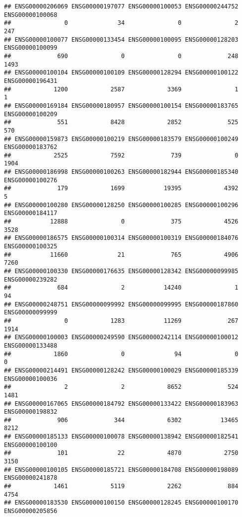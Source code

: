 \documentclass[
]{article}
\begin{document}
\begin{verbatim}
## ENSG00000206069 ENSG00000197077 ENSG00000100053 ENSG00000244752 ENSG00000100068 
##               0              34               0               2             247 
## ENSG00000100077 ENSG00000133454 ENSG00000100095 ENSG00000128203 ENSG00000100099 
##             690               0               0             248            1493 
## ENSG00000100104 ENSG00000100109 ENSG00000128294 ENSG00000100122 ENSG00000196431 
##            1200            2587            3369               1               1 
## ENSG00000169184 ENSG00000180957 ENSG00000100154 ENSG00000183765 ENSG00000100209 
##             551            8428            2852             525             570 
## ENSG00000159873 ENSG00000100219 ENSG00000183579 ENSG00000100249 ENSG00000183762 
##            2525            7592             739               0            1904 
## ENSG00000186998 ENSG00000100263 ENSG00000182944 ENSG00000185340 ENSG00000100276 
##             179            1699           19395            4392               5 
## ENSG00000100280 ENSG00000128250 ENSG00000100285 ENSG00000100296 ENSG00000184117 
##           12888               0             375            4526            3528 
## ENSG00000186575 ENSG00000100314 ENSG00000100319 ENSG00000184076 ENSG00000100325 
##           11660              21             765            4906            7260 
## ENSG00000100330 ENSG00000176635 ENSG00000128342 ENSG00000099985 ENSG00000239282 
##             684               2           14240               1              94 
## ENSG00000248751 ENSG00000099992 ENSG00000099995 ENSG00000187860 ENSG00000099999 
##               0            1283           11269             267            1914 
## ENSG00000100003 ENSG00000249590 ENSG00000242114 ENSG00000100012 ENSG00000133488 
##            1860               0              94               0               0 
## ENSG00000214491 ENSG00000128242 ENSG00000100029 ENSG00000185339 ENSG00000100036 
##               2               2            8652             524            1481 
## ENSG00000167065 ENSG00000184792 ENSG00000133422 ENSG00000183963 ENSG00000198832 
##             906             344            6302           13465            8212 
## ENSG00000185133 ENSG00000100078 ENSG00000138942 ENSG00000182541 ENSG00000100100 
##             101              22            4870            2750            3150 
## ENSG00000100105 ENSG00000185721 ENSG00000184708 ENSG00000198089 ENSG00000241878 
##            1461            5119            2262             884            4754 
## ENSG00000183530 ENSG00000100150 ENSG00000128245 ENSG00000100170 ENSG00000205856 

\end{verbatim}
\end{document}
